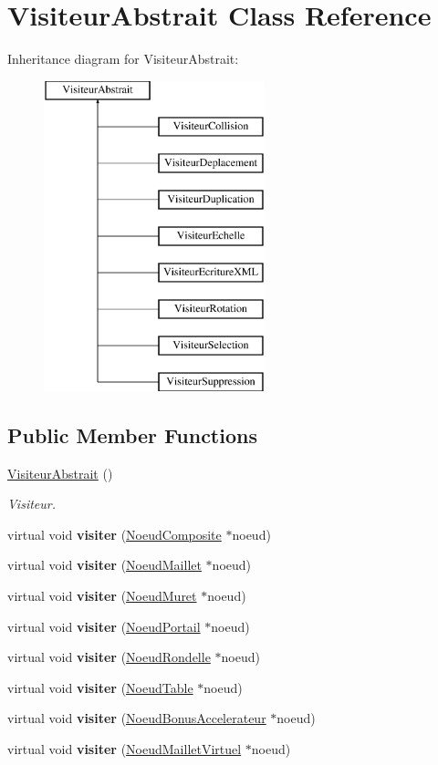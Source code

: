 \hypertarget{class_visiteur_abstrait}{}\section{Visiteur\+Abstrait Class Reference}
\label{class_visiteur_abstrait}
Inheritance diagram for Visiteur\+Abstrait\+:\begin{figure}[H]
\begin{center}
\leavevmode
\includegraphics[height=9.000000cm]{class_visiteur_abstrait}
\end{center}
\end{figure}
\subsection*{Public Member Functions}
\begin{DoxyCompactItemize}
\item 
\hyperlink{group__inf2990_gab30d8c699bab1b4538f79e5750468d2d}{Visiteur\+Abstrait} ()
\begin{DoxyCompactList}\small\item\em Visiteur. \end{DoxyCompactList}\item 
virtual void {\bfseries visiter} (\hyperlink{class_noeud_composite}{Noeud\+Composite} $\ast$noeud)
\item 
virtual void {\bfseries visiter} (\hyperlink{class_noeud_maillet}{Noeud\+Maillet} $\ast$noeud)
\item 
virtual void {\bfseries visiter} (\hyperlink{class_noeud_muret}{Noeud\+Muret} $\ast$noeud)
\item 
virtual void {\bfseries visiter} (\hyperlink{class_noeud_portail}{Noeud\+Portail} $\ast$noeud)
\item 
virtual void {\bfseries visiter} (\hyperlink{class_noeud_rondelle}{Noeud\+Rondelle} $\ast$noeud)
\item 
virtual void {\bfseries visiter} (\hyperlink{class_noeud_table}{Noeud\+Table} $\ast$noeud)
\item 
virtual void {\bfseries visiter} (\hyperlink{class_noeud_bonus_accelerateur}{Noeud\+Bonus\+Accelerateur} $\ast$noeud)
\item 
virtual void {\bfseries visiter} (\hyperlink{class_noeud_maillet_virtuel}{Noeud\+Maillet\+Virtuel} $\ast$noeud)
\end{DoxyCompactItemize}

